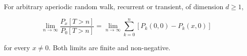 For arbitrary aperiodic random walk, recurrent or transient, of dimension $d \geq 1$,

$$\lim_{n \to \infty} \frac{P_x[T > n]}{P_0[T > n]} = \lim_{n \to \infty} \sum_{k=0}^{n} [P_k(0,0) - P_k(x,0)]$$

for every $x \neq 0$. Both limits are finite and non-negative.
